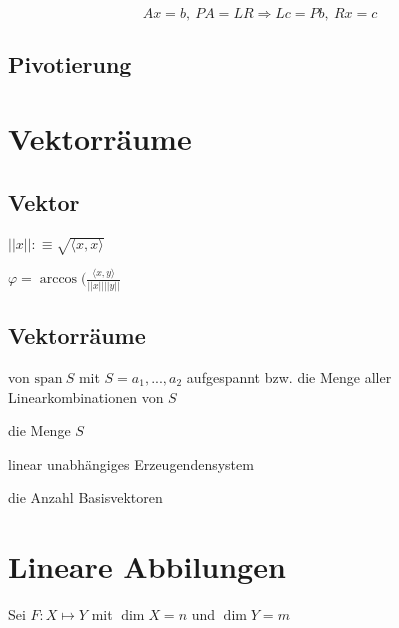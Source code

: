 \documentclass[11pt]{article}
\begin{document}
\begin{equation*}
	Ax = b,\ PA = LR \Rightarrow Lc = Pb,\ Rx = c
\end{equation*}

\subsection{Pivotierung}
\begin{description}[noitemsep]
	\item
\end{description}

\section{Vektorräume}

\subsection{Vektor}

\begin{description}[labelindent=16pt,style=multiline,leftmargin=4.5cm, noitemsep]
	\item[Länge, 2-Norm] $||x|| :\equiv \sqrt{\langle x,x\rangle}$
	\item[Winkel] $\varphi = \arccos(\frac{\langle x,y\rangle}{||x|| ||y||}$
\end{description}

\subsection{Vektorräume}

\begin{description}[labelindent=16pt,style=multiline,leftmargin=5cm, noitemsep]
	\item[Unterraum] von $\text{span}\ S$ mit $S = {a_1,...,a_2}$ aufgespannt bzw. die Menge aller Linearkombinationen von $S$
	\item[Erzeugendensystem] die Menge $S$
	\item[Basis] linear unabhängiges Erzeugendensystem
	\item[Dimension] die Anzahl Basisvektoren
\end{description}

\section{Lineare Abbilungen}

Sei $F: X \mapsto Y$ mit $\dim X = n$ und $\dim Y = m$
\end{document}
